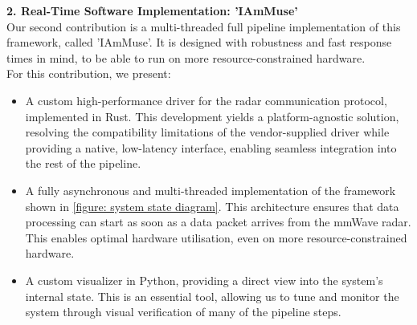 \noindent \textbf{2. Real-Time Software Implementation: 'IAmMuse'}\\
Our second contribution is a multi-threaded full pipeline implementation of this framework, called 'IAmMuse'.
It is designed with robustness and fast response times in mind, to be able to run on more resource-constrained hardware.\\
For this contribution, we present:
\begin{itemize}
    \item 
        A custom high-performance driver for the radar communication protocol, implemented in Rust.
        This development yields a platform-agnostic solution, resolving the compatibility limitations of the vendor-supplied driver while providing a native, low-latency interface, enabling seamless integration into the rest of the pipeline.
    \item 
        A fully asynchronous and multi-threaded implementation of the framework shown in \cref{figure: system state diagram}.
        This architecture ensures that data processing can start as soon as a data packet arrives from the mmWave radar.
        This enables optimal hardware utilisation, even on more resource-constrained hardware.
    \item 
        A custom visualizer in Python, providing a direct view into the system's internal state.
        This is an essential tool, allowing us to tune and monitor the system through visual verification of many of the pipeline steps.
\end{itemize}


